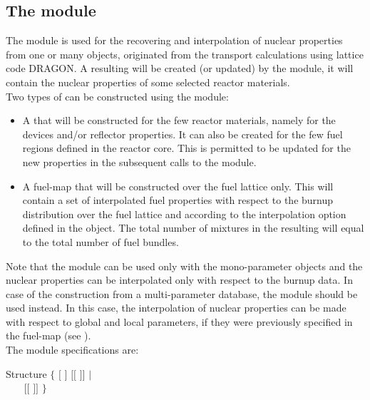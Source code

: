 \subsection{The  module}\label{sect:cre}

The  module is used for the recovering and interpolation of nuclear
properties from one or many  objects, originated from the transport
calculations using lattice code DRAGON. A resulting 
will be created (or updated) by the  module, it will contain the nuclear
properties of some selected reactor materials.\\

\noindent
Two types of  can be constructed using the  module:

\begin{itemize}

\item  A  that will be constructed for the few reactor materials,
namely for the devices and/or reflector properties. It can also be created for
the few fuel regions defined in the reactor core. This  is
permitted to be updated for the new properties in the subsequent calls to the
 module.
\item A fuel-map  that will be constructed over the fuel lattice
only. This  will contain a set of interpolated fuel properties with
respect to the burnup distribution over the fuel lattice and according to the
interpolation option defined in the  object. The total number of mixtures
in the resulting  will equal to the total number of fuel bundles.
\end{itemize}

\noindent
Note that the  module can be used only with the mono-parameter
 objects and the nuclear properties can be interpolated only with
respect to the burnup data. In case of the  construction from a
multi-parameter database, the  module should be used instead.
In this case, the interpolation of nuclear properties can be made with respect
to global and local parameters, if they were previously specified in the fuel-map
(see ).\\

\noindent
The  module specifications are:

\begin{DataStructure}{Structure }
$\{$  \moc{:=}  $[$  $]$
$[[$  $]]$  \moc{::}  $|$ \\
~~~ \moc{:=}  $[[$  $]]$
 \moc{::}  $\}$
\end{DataStructure}

